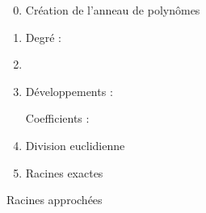 \begin{frame}[fragile]

\begin{enumerate}
  \setcounter{enumi}{-1}
  \item Création de l'anneau de polynômes
  
  \pause
  
  
  \pause  
  
  \pause  
  
  \pause  
  \item Degré : 
  
  \pause  
  
  \pause    
  \item  {}
\end{enumerate}
  
\pause
\begin{minipage}{0.49\textwidth}
\begin{enumerate}  
  \setcounter{enumi}{2}
  \item Développements : 
  
\pause      
  Coefficients : 
\end{enumerate}
\end{minipage}  
\pause
\begin{minipage}{0.49\textwidth}
\begin{enumerate}  
  \setcounter{enumi}{3}
  \item Division euclidienne
  
\pause  
  
\pause  
\end{enumerate}   
\end{minipage}

\medskip
  
\pause
\begin{minipage}{0.49\textwidth}
\begin{enumerate}  
  \setcounter{enumi}{4}     
  \item Racines exactes
 
  \smallskip
  
\pause  

\pause       
  
\pause    
  
  \end{enumerate}
  \end{minipage}  
\pause
  \begin{minipage}{0.49\textwidth} 
  Racines approchées
  
  \smallskip
  
  
\pause    
  \end{minipage} 

\end{frame}


